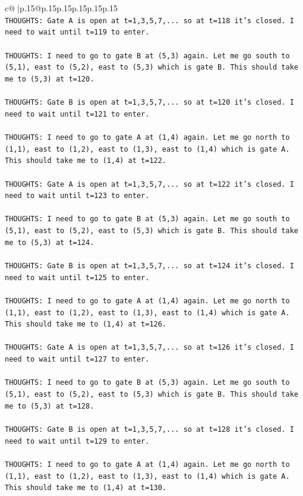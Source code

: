 \documentclass{article}
\begin{document}
{\begin{supertabular}{c@{$\;$}|p{.15\linewidth}@{}p{.15\linewidth}p{.15\linewidth}p{.15\linewidth}p{.15\linewidth}p{.15\linewidth}}
{{{\\ 
\texttt{THOUGHTS: Gate A is open at t=1,3,5,7,... so at t=118 it's closed. I need to wait until t=119 to enter.} \\
\\ 
\texttt{THOUGHTS: I need to go to gate B at (5,3) again. Let me go south to (5,1), east to (5,2), east to (5,3) which is gate B. This should take me to (5,3) at t=120.} \\
\\ 
\texttt{THOUGHTS: Gate B is open at t=1,3,5,7,... so at t=120 it's closed. I need to wait until t=121 to enter.} \\
\\ 
\texttt{THOUGHTS: I need to go to gate A at (1,4) again. Let me go north to (1,1), east to (1,2), east to (1,3), east to (1,4) which is gate A. This should take me to (1,4) at t=122.} \\
\\ 
\texttt{THOUGHTS: Gate A is open at t=1,3,5,7,... so at t=122 it's closed. I need to wait until t=123 to enter.} \\
\\ 
\texttt{THOUGHTS: I need to go to gate B at (5,3) again. Let me go south to (5,1), east to (5,2), east to (5,3) which is gate B. This should take me to (5,3) at t=124.} \\
\\ 
\texttt{THOUGHTS: Gate B is open at t=1,3,5,7,... so at t=124 it's closed. I need to wait until t=125 to enter.} \\
\\ 
\texttt{THOUGHTS: I need to go to gate A at (1,4) again. Let me go north to (1,1), east to (1,2), east to (1,3), east to (1,4) which is gate A. This should take me to (1,4) at t=126.} \\
\\ 
\texttt{THOUGHTS: Gate A is open at t=1,3,5,7,... so at t=126 it's closed. I need to wait until t=127 to enter.} \\
\\ 
\texttt{THOUGHTS: I need to go to gate B at (5,3) again. Let me go south to (5,1), east to (5,2), east to (5,3) which is gate B. This should take me to (5,3) at t=128.} \\
\\ 
\texttt{THOUGHTS: Gate B is open at t=1,3,5,7,... so at t=128 it's closed. I need to wait until t=129 to enter.} \\
\\ 
\texttt{THOUGHTS: I need to go to gate A at (1,4) again. Let me go north to (1,1), east to (1,2), east to (1,3), east to (1,4) which is gate A. This should take me to (1,4) at t=130.} \\
}}}
\end{supertabular}}
\end{document}
